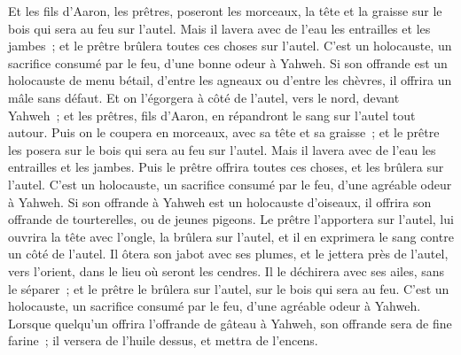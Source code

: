 \begin{multicols}{2}
Et les fils d'Aaron, les prêtres, poseront les morceaux, la tête et la graisse sur le bois qui sera au feu sur l'autel.
Mais il lavera avec de l'eau les entrailles et les jambes~; et le prêtre brûlera toutes ces choses sur l'autel. C'est un holocauste, un sacrifice consumé par le feu, d'une bonne odeur à Yahweh.
Si son offrande est un holocauste de menu bétail, d'entre les agneaux ou d'entre les chèvres, il offrira un mâle sans défaut.
Et on l'égorgera à côté de l'autel, vers le nord, devant Yahweh~; et les prêtres, fils d'Aaron, en répandront le sang sur l'autel tout autour.
Puis on le coupera en morceaux, avec sa tête et sa graisse~; et le prêtre les posera sur le bois qui sera au feu sur l'autel.
Mais il lavera avec de l'eau les entrailles et les jambes. Puis le prêtre offrira toutes ces choses, et les brûlera sur l'autel. C'est un holocauste, un sacrifice consumé par le feu, d'une agréable odeur à Yahweh.
Si son offrande à Yahweh est un holocauste d'oiseaux, il offrira son offrande de tourterelles, ou de jeunes pigeons.
Le prêtre l'apportera sur l'autel, lui ouvrira la tête avec l'ongle, la brûlera sur l'autel, et il en exprimera le sang contre un côté de l'autel.
Il ôtera son jabot avec ses plumes, et le jettera près de l'autel, vers l'orient, dans le lieu où seront les cendres.
Il le déchirera avec ses ailes, sans le séparer~; et le prêtre le brûlera sur l'autel, sur le bois qui sera au feu. C'est un holocauste, un sacrifice consumé par le feu, d'une agréable odeur à Yahweh.
\VerseOne{}Lorsque quelqu'un offrira l'offrande de gâteau à Yahweh, son offrande sera de fine farine~; il versera de l'huile dessus, et mettra de l'encens.

\end{multicols}
